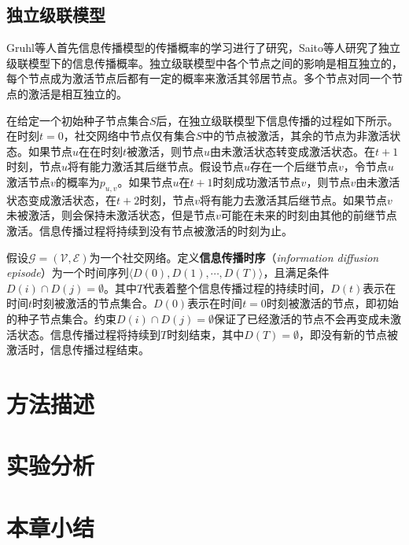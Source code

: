 \subsection{独立级联模型}
\label{subsec5:icModel}
Gruhl等人首先信息传播模型的传播概率的学习进行了研究，Saito等人研究了独立级联模型下的信息传播概率。独立级联模型中各个节点之间的影响是相互独立的，每个节点成为激活节点后都有一定的概率来激活其邻居节点。多个节点对同一个节点的激活是相互独立的。

在给定一个初始种子节点集合$S$后，在独立级联模型下信息传播的过程如下所示。在时刻$t=0$，社交网络中节点仅有集合$S$中的节点被激活，其余的节点为非激活状态。如果节点$u$在在时刻$t$被激活，则节点$u$由未激活状态转变成激活状态。在$t+1$时刻，节点$u$将有能力激活其后继节点。假设节点$u$存在一个后继节点$v$，令节点$u$激活节点$v$的概率为$p_{u,v}$。如果节点$u$在$t+1$时刻成功激活节点$v$，则节点$v$由未激活状态变成激活状态，在$t+2$时刻，节点$v$将有能力去激活其后继节点。如果节点$v$未被激活，则会保持未激活状态，但是节点$v$可能在未来的时刻由其他的前继节点激活。信息传播过程将持续到没有节点被激活的时刻为止。

假设$\mathcal{G}=\left(\mathcal{V},\mathcal{E}\right)$为一个社交网络。定义\textbf{信息传播时序}（\textit{information diffusion episode}）为一个时间序列$\langle D\left(0\right), D\left(1\right), \cdots, D\left(T\right) \rangle$，且满足条件$D\left(i\right) \cap D\left(j\right) = \emptyset$。其中$T$代表着整个信息传播过程的持续时间，$D\left(t\right)$表示在时间$t$时刻被激活的节点集合。$D\left(0\right)$表示在时间$t=0$时刻被激活的节点，即初始的种子节点集合。约束$D\left(i\right) \cap D\left(j\right) = \emptyset$保证了已经激活的节点不会再变成未激活状态。信息传播过程将持续到$T$时刻结束，其中$D\left(T\right) = \emptyset$，即没有新的节点被激活时，信息传播过程结束。
\section{方法描述}
\label{sec5:method}

\section{实验分析}
\label{sec5:experiment}

\section{本章小结}
\label{sec5:conclusion}